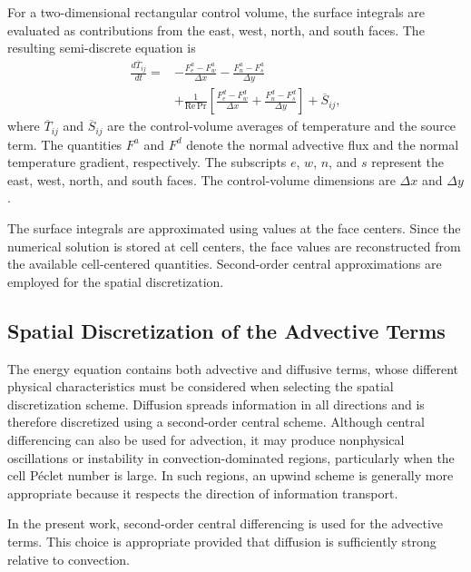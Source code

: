 For a two-dimensional rectangular control volume, the surface
integrals are evaluated as contributions from the east, west,
north, and south faces. The resulting semi-discrete equation is
\begin{equation}
\begin{aligned}
\frac{d\overline{T}_{ij}}{dt}
={}&
-\frac{F^a_e-F^a_w}{\Delta x}
-\frac{F^a_n-F^a_s}{\Delta y}
\\
&+
\frac{1}{\mathrm{Re}\,\mathrm{Pr}}
\left[
\frac{F^d_e-F^d_w}{\Delta x}
+
\frac{F^d_n-F^d_s}{\Delta y}
\right]
+\overline{S}_{ij},
\end{aligned}
\label{eq:fv_semidiscrete}
\end{equation}
where $\overline{T}_{ij}$ and $\overline{S}_{ij}$ are the
control-volume averages of temperature and the source term.
The quantities $F^a$ and $F^d$ denote the normal advective
flux and the normal temperature gradient, respectively.
The subscripts $e$, $w$, $n$, and $s$ represent the east,
west, north, and south faces. The control-volume dimensions
are $\Delta x$ and $\Delta y$.

The surface integrals are approximated using values at the
face centers. Since the numerical solution is stored at
cell centers, the face values are reconstructed from the
available cell-centered quantities. Second-order central
approximations are employed for the spatial discretization.

\subsection{Spatial Discretization of the Advective Terms}

The energy equation contains both advective and diffusive
terms, whose different physical characteristics must be
considered when selecting the spatial discretization scheme.
Diffusion spreads information in all directions and is
therefore discretized using a second-order central scheme.
Although central differencing can also be used for advection,
it may produce nonphysical oscillations or instability in
convection-dominated regions, particularly when the cell
Péclet number is large. In such regions, an upwind scheme
is generally more appropriate because it respects the direction
of information transport.

In the present work, second-order central differencing is used
for the advective terms. This choice is appropriate provided
that diffusion is sufficiently strong relative to convection.

